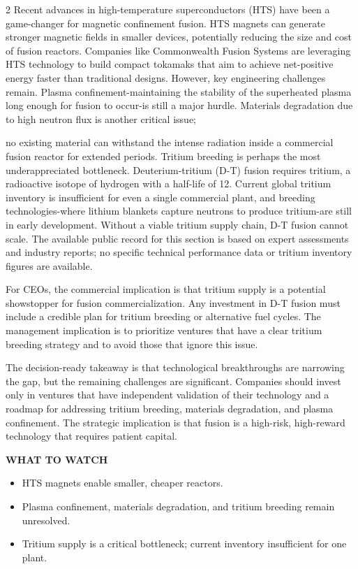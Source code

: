 \documentclass[10pt,a4paper]{article}
\begin{document}
\begin{multicols}{2}
{\small Recent advances in high-temperature superconductors (HTS) have been a game-changer for magnetic confinement fusion. HTS magnets can generate stronger magnetic fields in smaller devices, potentially reducing the size and cost of fusion reactors. Companies like Commonwealth Fusion Systems are leveraging HTS technology to build compact tokamaks that aim to achieve net-positive energy faster than traditional designs. However, key engineering challenges remain. Plasma confinement-maintaining the stability of the superheated plasma long enough for fusion to occur-is still a major hurdle. Materials degradation due to high neutron flux is another critical issue;}\par
{\small no existing material can withstand the intense radiation inside a commercial fusion reactor for extended periods. Tritium breeding is perhaps the most underappreciated bottleneck. Deuterium-tritium (D-T) fusion requires tritium, a radioactive isotope of hydrogen with a half-life of 12. Current global tritium inventory is insufficient for even a single commercial plant, and breeding technologies-where lithium blankets capture neutrons to produce tritium-are still in early development. Without a viable tritium supply chain, D-T fusion cannot scale. The available public record for this section is based on expert assessments and industry reports; no specific technical performance data or tritium inventory figures are available.}\par
{\small For CEOs, the commercial implication is that tritium supply is a potential showstopper for fusion commercialization. Any investment in D-T fusion must include a credible plan for tritium breeding or alternative fuel cycles. The management implication is to prioritize ventures that have a clear tritium breeding strategy and to avoid those that ignore this issue.}\par
{\small The decision-ready takeaway is that technological breakthroughs are narrowing the gap, but the remaining challenges are significant. Companies should invest only in ventures that have independent validation of their technology and a roadmap for addressing tritium breeding, materials degradation, and plasma confinement. The strategic implication is that fusion is a high-risk, high-reward technology that requires patient capital.}\par
\end{multicols}
\vspace{4pt}\noindent\begin{minipage}{\linewidth}
{\textcolor{BOGreen}{\scriptsize\bfseries WHAT TO WATCH}}\par\vspace{2pt}
{\footnotesize\begin{itemize}
\item HTS magnets enable smaller, cheaper reactors.
\item Plasma confinement, materials degradation, and tritium breeding remain unresolved.
\item Tritium supply is a critical bottleneck; current inventory insufficient for one plant.
\end{itemize}}
\end{minipage}
\label{chap:2:end}
\end{document}
